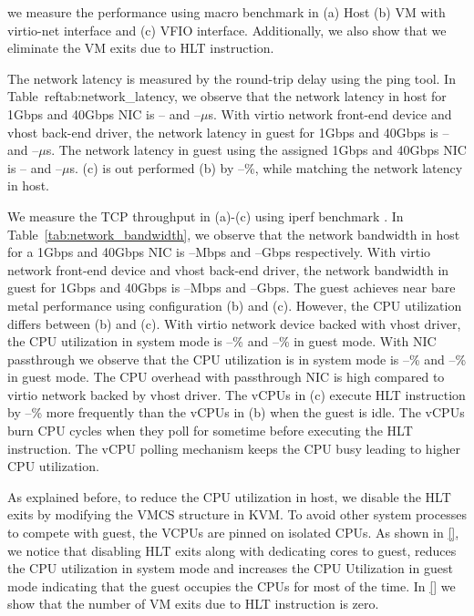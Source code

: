 we measure the performance using macro benchmark in (a) Host
(b) VM with virtio-net interface and (c) VFIO interface.
Additionally, we also show that we eliminate the VM exits due
to HLT instruction.

The network latency is measured by the round-trip delay using
the ping tool. In Table~ref{tab:network\_latency}, we observe
that the network latency in host for 1Gbps and 40Gbps NIC is
-- and --$\mu$s. With virtio network front-end device and
vhost back-end driver, the network latency in guest for 1Gbps
and 40Gbps is -- and --$\mu$s. The network latency in guest
using the assigned 1Gbps and 40Gbps NIC is -- and --$\mu$s.
(c) is out performed (b) by --\%, while matching the network
latency in host.

We measure the TCP throughput in (a)-(c) using iperf benchmark
\cite{}. In Table~\ref{tab:network_bandwidth}, we observe that
the network bandwidth in host for a 1Gbps and 40Gbps NIC is
--Mbps and --Gbps respectively. With virtio network front-end
device and vhost back-end driver, the network bandwidth in
guest for 1Gbps and 40Gbps is --Mbps and --Gbps. The guest
achieves near bare metal performance using configuration (b)
and (c).  However, the CPU utilization differs between (b) and
(c). With virtio network device backed with vhost driver, the
CPU utilization in system mode is --\% and --\% in guest mode.
With NIC passthrough we observe that the CPU utilization is in
system mode is --\% and --\% in guest mode. The CPU overhead
with passthrough NIC is high compared to virtio network backed
by vhost driver. The vCPUs in (c) execute HLT instruction by
--\% more frequently than the vCPUs in (b) when the guest is
idle. The vCPUs burn CPU cycles when they poll for sometime
before executing the HLT instruction. The vCPU polling
mechanism keeps the CPU busy leading to higher CPU
utilization.

As explained before, to reduce the CPU utilization in host, we
disable the HLT exits by modifying the VMCS structure in KVM.
To avoid other system processes to compete with guest, the
VCPUs are pinned on isolated CPUs. As shown in \ref{}, we
notice that disabling HLT exits along with dedicating cores to
guest, reduces the CPU utilization in system mode and
increases the CPU Utilization in guest mode indicating that
the guest occupies the CPUs for most of the time. In \ref{} we
show that the number of VM exits due to HLT instruction is
zero.
